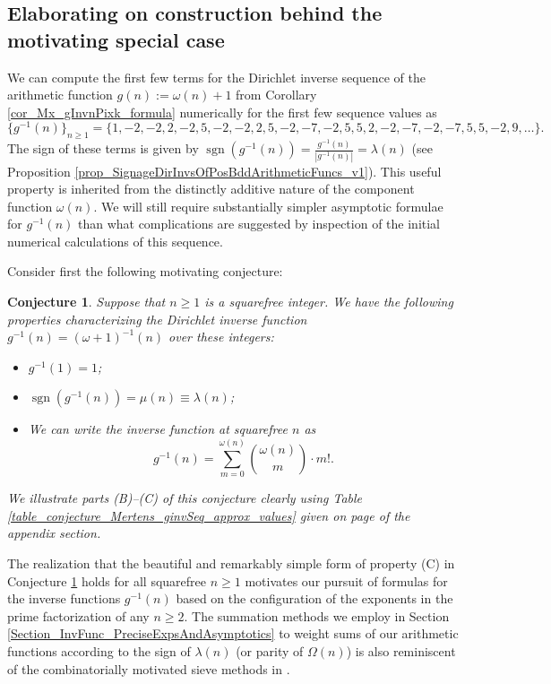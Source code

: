 \documentclass[11pt,reqno,a4letter]{article}
\numberwithin{figure}{section}
\numberwithin{table}{section}
\theoremstyle{plain}
\newtheorem{conjecture}[theorem]{Conjecture}
\numberwithin{theorem}{section}
\theoremstyle{definition}
\newcommand{\NBRef}[1]{}
\begin{document}
\subsection{Elaborating on construction behind the motivating special case} 
\label{example_InvertingARecRelForMx_Intro}

We can compute the first few terms for the
Dirichlet inverse sequence of the arithmetic function 
$g(n) := \omega(n) + 1$ from 
Corollary \ref{cor_Mx_gInvnPixk_formula} 
numerically for the first few sequence values as 
\[
\{g^{-1}(n)\}_{n \geq 1} = \{1, -2, -2, 2, -2, 5, -2, -2, 2, 5, -2, -7, -2, 5, 5, 2, -2, -7, -2, 
     -7, 5, 5, -2, 9, \ldots \}. 
\] 
The sign of these terms is given by $\operatorname{sgn}(g^{-1}(n)) = \frac{g^{-1}(n)}{|g^{-1}(n)|} = \lambda(n)$ 
(see Proposition \ref{prop_SignageDirInvsOfPosBddArithmeticFuncs_v1}). 
This useful property is inherited from the distinctly 
additive nature of the component function $\omega(n)$. 
We will still require substantially simpler asymptotic formulae for $g^{-1}(n)$ than what 
complications are suggested by inspection of the initial 
numerical calculations of this sequence. 

Consider first the following motivating conjecture: 
\NBRef{A01-2020-04-26}

\begin{conjecture}
\label{lemma_gInv_MxExample} 
Suppose that $n \geq 1$ is a squarefree integer. We have the following properties characterizing the 
Dirichlet inverse function $g^{-1}(n) = (\omega+1)^{-1}(n)$ over these integers: 
\begin{itemize} 

\item[(A)] $g^{-1}(1) = 1$; 
\item[(B)] $\operatorname{sgn}(g^{-1}(n)) = \mu(n) \equiv \lambda(n)$; 
\item[(C)] We can write the inverse function at squarefree $n$ as 
     \[
     g^{-1}(n) = \sum_{m=0}^{\omega(n)} \binom{\omega(n)}{m} \cdot m!. 
     \]
\end{itemize} 
We illustrate parts (B)--(C) of this conjecture clearly using 
Table \ref{table_conjecture_Mertens_ginvSeq_approx_values} given on 
page \pageref{table_conjecture_Mertens_ginvSeq_approx_values} of the appendix section. 
\end{conjecture} 

The realization that the beautiful and remarkably simple form of property (C) 
in Conjecture \ref{lemma_gInv_MxExample} holds for all squarefree $n \geq 1$ 
motivates our pursuit of formulas for the inverse functions $g^{-1}(n)$ based on the configuration of the 
exponents in the prime factorization of any $n \geq 2$. 
The summation methods we employ in Section \ref{Section_InvFunc_PreciseExpsAndAsymptotics} 
to weight sums of our arithmetic functions according to the sign of 
$\lambda(n)$ (or parity of $\Omega(n)$) is also 
reminiscent of the combinatorially motivated sieve methods in 
\cite[\S 17]{OPERADECRIBERO}. 
\end{document}
